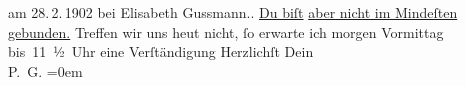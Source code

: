 \begin{ledgroupsized}[t]{13cm}
{{{                  am 28. 2. 1902 bei
                     Elisabeth Gussmann.}}}\label{K_L03367-1h}. \uline{Du biſt}{ }\uline{aber nicht im Mindeſten gebunden.} Treffen wir uns
                  heut nicht, ſo erwarte ich morgen{ }Vormittag bis 11 ½ Uhr eine Verſtändigung\pend
           \pstart
           Herzlichſt Dein {\\[\baselineskip]}\spacefill\mbox{P. G.}\pend
           \leftskip=0em{}
         
         \endnumbering{}\end{ledgroupsized}  \newcommand{\dateiname}{L03367}\newcommand{\titel}{Paul Goldmann an Arthur Schnitzler, 28. 2. 1903}\newcommand{\editorInnen}{Martin Anton Müller und Laura Untner}
      
